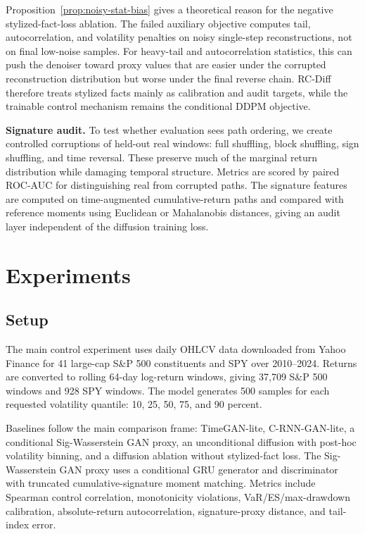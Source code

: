 \documentclass[letterpaper]{article}
\begin{document}
Proposition~\ref{prop:noisy-stat-bias} gives a theoretical reason for the negative stylized-fact-loss ablation. The failed auxiliary objective computes tail, autocorrelation, and volatility penalties on noisy single-step reconstructions, not on final low-noise samples. For heavy-tail and autocorrelation statistics, this can push the denoiser toward proxy values that are easier under the corrupted reconstruction distribution but worse under the final reverse chain. RC-Diff therefore treats stylized facts mainly as calibration and audit targets, while the trainable control mechanism remains the conditional DDPM objective.

\textbf{Signature audit.} To test whether evaluation sees path ordering, we create controlled corruptions of held-out real windows: full shuffling, block shuffling, sign shuffling, and time reversal. These preserve much of the marginal return distribution while damaging temporal structure. Metrics are scored by paired ROC-AUC for distinguishing real from corrupted paths. The signature features are computed on time-augmented cumulative-return paths and compared with reference moments using Euclidean or Mahalanobis distances, giving an audit layer independent of the diffusion training loss.

\section{Experiments}
\subsection{Setup}
The main control experiment uses daily OHLCV data downloaded from Yahoo Finance for 41 large-cap S\&P 500 constituents and SPY over 2010--2024. Returns are converted to rolling 64-day log-return windows, giving 37,709 S\&P 500 windows and 928 SPY windows. The model generates 500 samples for each requested volatility quantile: 10, 25, 50, 75, and 90 percent.

Baselines follow the main comparison frame: TimeGAN-lite, C-RNN-GAN-lite, a conditional Sig-Wasserstein GAN proxy, an unconditional diffusion with post-hoc volatility binning, and a diffusion ablation without stylized-fact loss. The Sig-Wasserstein GAN proxy uses a conditional GRU generator and discriminator with truncated cumulative-signature moment matching. Metrics include Spearman control correlation, monotonicity violations, VaR/ES/max-drawdown calibration, absolute-return autocorrelation, signature-proxy distance, and tail-index error.
\end{document}
